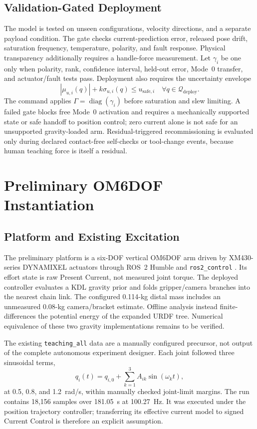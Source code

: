 \documentclass[conference]{IEEEtran}
\begin{document}
\subsection{Validation-Gated Deployment}
The model is tested on unseen configurations, velocity directions, and a
separate payload condition. The gate checks current-prediction error, released
pose drift, saturation frequency, temperature, polarity, and fault response.
Physical transparency additionally requires a handle-force measurement. Let
$\gamma_i$ be one only when polarity, rank, confidence interval, held-out
error, Mode~0 transfer, and actuator/fault tests pass. Deployment also requires
the uncertainty envelope
\begin{equation}
 |\mu_{u,i}(q)|+k\sigma_{u,i}(q)\le u_{\mathrm{safe},i}
 \quad\forall q\in\mathcal Q_{\mathrm{deploy}}.
 \label{eq:validation_gate}
\end{equation}
The command applies $\Gamma=\operatorname{diag}(\gamma_i)$ before saturation
and slew limiting. A failed gate blocks free Mode~0 activation and requires a
mechanically supported state or safe handoff to position control; zero current
alone is not safe for an unsupported gravity-loaded arm. Residual-triggered
recommissioning is evaluated only during declared contact-free self-checks or
tool-change events, because human teaching force is itself a residual.

\section{Preliminary OM6DOF Instantiation}
\subsection{Platform and Existing Excitation}
The preliminary platform is a six-DOF vertical OM6DOF arm driven by
XM430-series DYNAMIXEL actuators \cite{RobotisXM430} through ROS~2 Humble and
\texttt{ros2\_control} \cite{ROS2Control}. Its effort state is raw Present
Current, not measured joint torque. The deployed controller evaluates a KDL
gravity prior and folds gripper/camera branches into the nearest chain link.
The configured 0.114-kg distal mass includes an unmeasured 0.08-kg
camera/bracket estimate. Offline analysis instead finite-differences the
potential energy of the expanded URDF tree. Numerical equivalence of these two
gravity implementations remains to be verified.

The existing \texttt{teaching\_all} data are a manually configured precursor,
not output of the complete autonomous experiment designer. Each joint followed
three sinusoidal terms,
\begin{equation}
 q_i(t)=q_{i,0}+\sum_{k=1}^{3}A_{ik}\sin(\omega_k t),
 \label{eq:multisine}
\end{equation}
at 0.5, 0.8, and 1.2~rad/s, within manually checked joint-limit margins. The
run contains 18,156 samples over 181.05~s at 100.27~Hz. It was executed under
the position trajectory controller; transferring its effective current model
to signed Current Control is therefore an explicit assumption.
\end{document}

